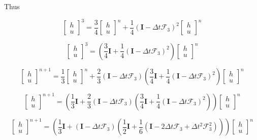 \documentclass[12pt]{article}
\begin{document}
Thus

\[\left[\begin{array}{c}
h \\ u
\end{array}\right]^{3} = \frac{3}{4}\left[\begin{array}{c}
h \\ u
\end{array}\right]^n +  \frac{1}{4}(\boldsymbol{I} - \Delta t\boldsymbol{\mathcal{F}}_3 )^2\left[\begin{array}{c}
h \\ u
\end{array}\right]^n\]

\[\left[\begin{array}{c}
h \\ u
\end{array}\right]^{3} = \left(\frac{3}{4}\boldsymbol{I}  +  \frac{1}{4}(\boldsymbol{I} - \Delta t\boldsymbol{\mathcal{F}}_3 )^2\right)\left[\begin{array}{c}
h \\ u
\end{array}\right]^n\]

\[\left[\begin{array}{c}
h \\ u
\end{array}\right]^{n+1} = \frac{1}{3}\left[\begin{array}{c}
h \\ u
\end{array}\right]^n + \frac{2}{3}(\boldsymbol{I} - \Delta t\boldsymbol{\mathcal{F}}_3 )\left(\frac{3}{4}\boldsymbol{I}  +  \frac{1}{4}\left(\boldsymbol{I} - \Delta t\boldsymbol{\mathcal{F}}_3 \right)^2\right)\left[\begin{array}{c}
h \\ u
\end{array}\right]^n\]

\[\left[\begin{array}{c}
h \\ u
\end{array}\right]^{n+1} = \left(\frac{1}{3}\boldsymbol{I} +  \frac{2}{3}(\boldsymbol{I} - \Delta t\boldsymbol{\mathcal{F}}_3 )\left(\frac{3}{4}\boldsymbol{I}  +  \frac{1}{4}\left(\boldsymbol{I} - \Delta t\boldsymbol{\mathcal{F}}_3 \right)^2\right) \right)\left[\begin{array}{c}
h \\ u
\end{array}\right]^n\]

\[\left[\begin{array}{c}
h \\ u
\end{array}\right]^{n+1} = \left(\frac{1}{3}\boldsymbol{I} + (\boldsymbol{I} - \Delta t\boldsymbol{\mathcal{F}}_3 )\left(\frac{1}{2}\boldsymbol{I}  +  \frac{1}{6}\left(\boldsymbol{I} - 2\Delta t\boldsymbol{\mathcal{F}}_3 + \Delta t^2\boldsymbol{\mathcal{F}}_3^2 \right)\right) \right)\left[\begin{array}{c}
h \\ u
\end{array}\right]^n\]
\end{document}
